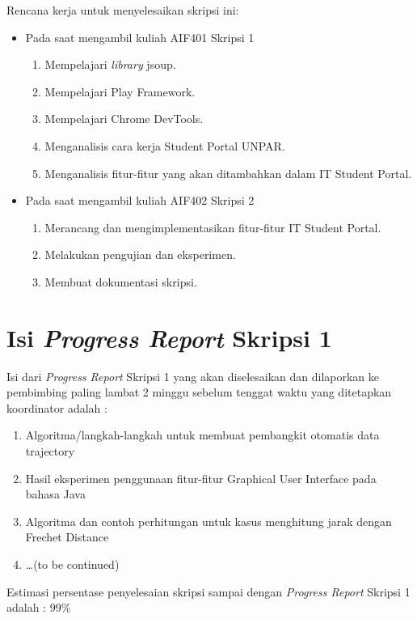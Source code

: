 \documentclass[a4paper,twoside]{article}
\begin{document}
Rencana kerja untuk menyelesaikan skripsi ini:
\begin{itemize}
	\item Pada saat mengambil kuliah AIF401 Skripsi 1
	\begin{enumerate}
		\item Mempelajari \textit{library} jsoup.
		\item Mempelajari Play Framework.
		\item Mempelajari Chrome DevTools.
		\item Menganalisis cara kerja Student Portal UNPAR.
		\item Menganalisis fitur-fitur yang akan ditambahkan dalam IT Student Portal.
	\end{enumerate}
	\item Pada saat mengambil kuliah AIF402 Skripsi 2
	\begin{enumerate}
		\item Merancang dan mengimplementasikan fitur-fitur IT Student Portal. 
		\item Melakukan pengujian dan eksperimen.
		\item Membuat dokumentasi skripsi.
	\end{enumerate}
\end{itemize}

\section{Isi {\it Progress Report} Skripsi 1}
Isi dari {\it Progress Report} Skripsi 1 yang akan diselesaikan dan dilaporkan ke pembimbing paling lambat 2 minggu sebelum tenggat waktu yang ditetapkan koordinator adalah :
\begin{enumerate}
	\item Algoritma/langkah-langkah untuk membuat pembangkit otomatis data trajectory
	\item Hasil eksperimen penggunaan fitur-fitur Graphical User Interface pada bahasa Java
	\item Algoritma dan contoh perhitungan untuk kasus menghitung jarak dengan Frechet Distance
	\item \ldots (to be continued)
\end{enumerate}
Estimasi persentase penyelesaian skripsi sampai dengan {\it Progress Report} Skripsi 1 adalah : 99\%
\end{document}
